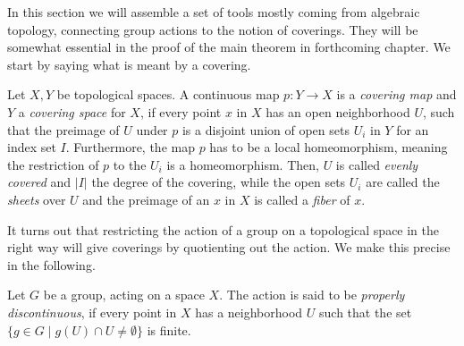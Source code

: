 In this section we will assemble a set of tools mostly coming from algebraic topology, connecting group actions to the notion of coverings.
They will be somewhat essential in the proof of the main theorem in forthcoming chapter.
We start by saying what is meant by a covering.


\begin{definition}\label{def:covering}
    Let \(X, Y\) be topological spaces.
    A continuous map \(p: Y\to X\) is a \emph{covering map} and \(Y\) a \emph{covering space} for \(X\), if every point \(x\) in \(X\) has an open neighborhood \(U\), such that the preimage of \(U\) under \(p\) is a disjoint union of open sets \(U_i\) in \(Y\) for an index set \(I\).
    Furthermore, the map \(p\) has to be a local homeomorphism, meaning the restriction of \(p\) to the \(U_i\) is a homeomorphism.
    Then, \(U\) is called \emph{evenly covered} and \(\vert I \vert\) the degree of the covering, while the open sets \(U_i\) are called the \emph{sheets} over \(U\) and the preimage of an \(x\) in \(X\) is called a \emph{fiber} of \(x\).
\end{definition}

It turns out that restricting the action of a group on a topological space in the right way will give coverings by quotienting out the action.
We make this precise in the following.

\begin{definition}
    Let \(G\) be a group, acting on a space \(X\).
    The action is said to be \emph{properly discontinuous}, if every point in \(X\) has a neighborhood \(U\) such that the set \(\{g\in G\;\vert\; g(U)\cap U \neq \emptyset\}\) is finite.
\end{definition}

